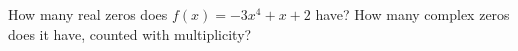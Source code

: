 How many real zeros does $f(x)=-3x^4+x+2$ have? How many complex zeros does it have, counted with multiplicity?

